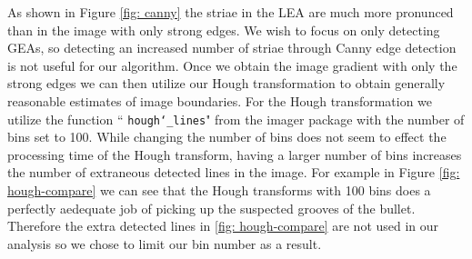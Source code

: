 \documentclass[12pt]{article}
\theoremstyle{nonumberplain}
\begin{document}
As shown in Figure \ref{fig: canny} the striae in the LEA are much more pronunced than in the image with only strong edges. We wish to focus on only detecting GEAs, so detecting an increased number of striae through Canny edge detection is not useful for our algorithm. Once we obtain the image gradient with only the strong edges we can then utilize our Hough transformation to obtain generally reasonable estimates of image boundaries. For the Hough transformation we utilize the function `` \texttt{hough\char`_lines}" from the imager package with the number of bins set to 100. While changing the number of bins does not seem to effect the processing time of the Hough transform, having a larger number of bins increases the number of extraneous detected lines in the image. For example in Figure \ref{fig: hough-compare} we can see that the Hough transforms with 100 bins does a perfectly aedequate job of picking up the suspected grooves of the bullet. Therefore the extra detected lines in \ref{fig: hough-compare} are not used in our analysis so we chose to limit our bin number as a result.
\end{document}
